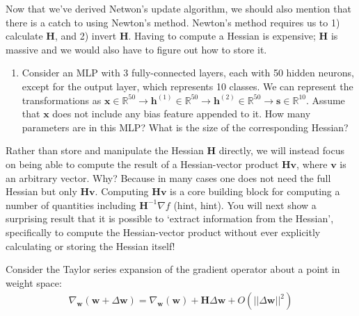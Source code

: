 Now that we've derived Netwon's update algorithm, we should also mention that there is a catch to using Newton's method. Newton's method requires us to 1) calculate $\mathbf{H}$, and 2) invert $\mathbf{H}$. Having to compute a Hessian is expensive; $\mathbf{H}$ is massive and we would also have to figure out how to store it. 


\begin{enumerate}[resume] 
\item Consider an MLP with 3 fully-connected layers, each with 50 hidden neurons, except for the output layer, which represents 10 classes. We can represent the transformations as 
$\mathbf{x} \in \mathbb{R}^{50} \longrightarrow 
\mathbf{h}^{(1)} \in \mathbb{R}^{50} \longrightarrow 
\mathbf{h}^{(2)} \in \mathbb{R}^{50} \longrightarrow
\mathbf{s} \in \mathbb{R}^{10}$. 
Assume that $\mathbf{x}$ does not include any bias feature appended to it. 
How many parameters are in this MLP? What is the size of the corresponding Hessian?
\end{enumerate}


Rather than store and manipulate the Hessian $\mathbf{H}$ directly, we will 
instead focus on being able to compute the result of a Hessian-vector product 
$\mathbf{H}\mathbf{v}$, where $\mathbf{v}$ is an arbitrary vector. 
Why? Because in many cases one does not need the full Hessian but only $\mathbf{H}\mathbf{v}$.
Computing $\mathbf{H}\mathbf{v}$ is a core building block for computing a number of quantities including $\mathbf{H}^{-1} \nabla f$ (hint, hint). 
You will next show a surprising result that it is 
possible to `extract information from the Hessian', specifically to compute 
the Hessian-vector product 
without ever explicitly calculating or storing the Hessian itself!

Consider the Taylor series expansion of the gradient operator about a point in weight space: 
\begin{align}\label{second-order-expantion}
    \nabla_\mathbf{w} (\mathbf{w} + \Delta \mathbf{w}) = \nabla_\mathbf{w} (\mathbf{w}) + \mathbf{H} \Delta \mathbf{w} + O(|| \Delta \mathbf{w} ||^2)
\end{align}

